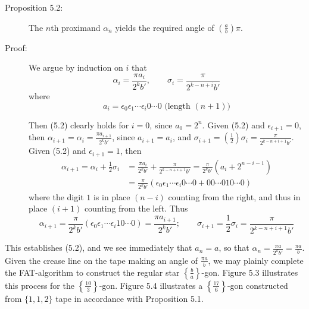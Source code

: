 \begin{description}

  \item[Proposition 5.2:] The $n$th proximand $\alpha_{n}$ yields the required angle of $\left( \frac{a}{b} \right) \pi$.

  \item[Proof:] We argue by induction on $i$ that
    \begin{equation}
    \alpha_{i} = \frac{\pi a_{i}}{2^{k}b'}, \qquad \sigma_{i} = \frac{\pi}{2^{k-n+i}b'}  \tag{5.2}
    \end{equation}
    where
    \begin{equation}
    a_{i} = \epsilon_{0} \epsilon_{1} \cdots \epsilon_{i}0 \cdots 0 \text{ (length $(n+1)$)}   \tag{5.3}
    \end{equation}

    Then (5.2) clearly holds for $i = 0$, since $a_{0} = 2^{n}$. Given (5.2) and $\epsilon_{i+1} = 0$, then $\alpha_{i+1} = \alpha_{i} = \frac{\pi a_{i+1}}{2^{k} b'}$, since $a_{i+1} = a_{i}$, and $\sigma_{i+1} = \left( \frac{1}{2} \right) \sigma_{i} = \frac{\pi}{2^{k-n+i+1} b'}$. Given (5.2) and $\epsilon_{i+1} = 1$, then
    \begin{align*}
    \alpha_{i+1} = \alpha_{i} + \frac{1}{2} \sigma_{i} & = \frac{\pi a_{i}}{2^{k}b'} + \frac{\pi}{2^{k-n+i+1}b'} = \frac{\pi}{2^{k}b'} (a_{i} + 2^{n-i-1}) \\
    & = \frac{\pi}{2^{k}b'} (\epsilon_{0} \epsilon_{1} \cdots \epsilon_{i}0 \cdots 0 + 00 \cdots 010 \cdots 0)
    \end{align*}
    where the digit $1$ is in place $(n-i)$ counting from the right, and thus in place $(i+1)$ counting from the left. Thus
    \begin{equation*}
    \alpha_{i+1} = \frac{\pi}{2^{k}b'} (\epsilon_{0} \epsilon_{1} \cdots \epsilon_{i} 10 \cdots 0) = \frac{\pi a_{i+1}}{2^{k}b'}; \qquad \sigma_{i+1} = \frac{1}{2} \sigma_{i} = \frac{\pi}{2^{k-n+i+1}b'}
    \end{equation*}

\end{description}

This establishes (5.2), and we see immediately that $a_{n} = a$, so that $\alpha_{n} = \frac{\pi a}{2^{k} b'} = \frac{\pi a}{b}$. Given the crease line on the tape making an angle of $\frac{\pi a}{b}$, we may plainly complete the FAT-algorithm to construct the regular star $\left\{ \frac{b}{a} \right\}$-gon. Figure 5.3 illustrates this process for the $\left\{ \frac{10}{3} \right\}$-gon. Figure 5.4 illustrates a $\left\{ \frac{17}{6} \right\}$-gon constructed from $\{ 1,1,2 \}$ tape in accordance with Proposition 5.1.

